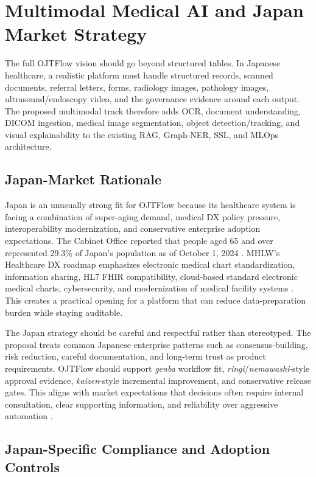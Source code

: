 \section{Multimodal Medical AI and Japan Market Strategy}

The full OJTFlow vision should go beyond structured tables. In Japanese healthcare, a realistic platform must handle structured records, scanned documents, referral letters, forms, radiology images, pathology images, ultrasound/endoscopy video, and the governance evidence around each output. The proposed multimodal track therefore adds OCR, document understanding, DICOM ingestion, medical image segmentation, object detection/tracking, and visual explainability to the existing RAG, Graph-NER, SSL, and MLOps architecture.

\subsection{Japan-Market Rationale}

Japan is an unusually strong fit for OJTFlow because its healthcare system is facing a combination of super-aging demand, medical DX policy pressure, interoperability modernization, and conservative enterprise adoption expectations. The Cabinet Office reported that people aged 65 and over represented 29.3\% of Japan's population as of October 1, 2024 \cite{japanAgingSociety}. MHLW's Healthcare DX roadmap emphasizes electronic medical chart standardization, information sharing, HL7 FHIR compatibility, cloud-based standard electronic medical charts, cybersecurity, and modernization of medical facility systems \cite{mhlwMedicalDXRoadmap,mhlwMedicalDX}. This creates a practical opening for a platform that can reduce data-preparation burden while staying auditable.

The Japan strategy should be careful and respectful rather than stereotyped. The proposal treats common Japanese enterprise patterns such as consensus-building, risk reduction, careful documentation, and long-term trust as product requirements. OJTFlow should support \textit{genba} workflow fit, \textit{ringi}/\textit{nemawashi}-style approval evidence, \textit{kaizen}-style incremental improvement, and conservative release gates. This aligns with market expectations that decisions often require internal consultation, clear supporting information, and reliability over aggressive automation \cite{japanBusinessCulture}.

\subsection{Japan-Specific Compliance and Adoption Controls}


